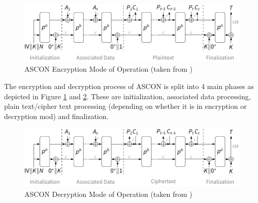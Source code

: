 \begin{figure}[H]
    \centering
    \includegraphics{images/fp/aead_encrypt.pdf}
    \caption{ASCON Encryption Mode of Operation (taken from \cite{dobraunig_ascon_nodate})}
    \label{fig:ascon-enc}
\end{figure}

The encryption and decryption process of ASCON is split into 4 main phases as depicted in Figure \ref{fig:ascon-enc} and \ref{fig:ascon-dec}. These are initialization, associated data processing, plain text/cipher text processing (depending on whether it is in encryption or decryption mod) and finalization. 



\begin{figure}[H]
    \centering
    \includegraphics{images/fp/aead_decrypt.pdf}
    \caption{ASCON Decryption Mode of Operation (taken from \cite{dobraunig_ascon_nodate})}
    \label{fig:ascon-dec}
\end{figure}

